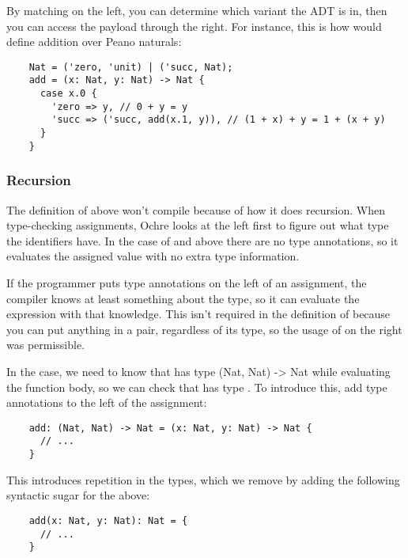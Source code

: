 \documentclass[12pt,twoside]{report}
\begin{document}
By matching on the left, you can determine which variant the ADT is in, then you can access the payload through the right. For instance, this is how would define addition over Peano naturals:

  \begin{verbatim}
    Nat = ('zero, 'unit) | ('succ, Nat);
    add = (x: Nat, y: Nat) -> Nat {
      case x.0 {
        'zero => y, // 0 + y = y
        'succ => ('succ, add(x.1, y)), // (1 + x) + y = 1 + (x + y)
      }
    }
  \end{verbatim}

\subsubsection{Recursion}
The definition of  above won't compile because of how it does recursion. When type-checking assignments, Ochre looks at the left first to figure out what type the identifiers have. In the case of  and  above there are no type annotations, so it evaluates the assigned value with no extra type information.

If the programmer puts type annotations on the left of an assignment, the compiler knows at least something about the type, so it can evaluate the expression with that knowledge. This isn't required in the definition of  because you can put anything in a pair, regardless of its type, so the usage of  on the right was permissible.

In the  case, we need to know that  has type {(Nat, Nat) -> Nat} while evaluating the function body, so we can check that  has type . To introduce this, add type annotations to the left of the assignment:

  \begin{verbatim}
    add: (Nat, Nat) -> Nat = (x: Nat, y: Nat) -> Nat {
      // ...
    }
  \end{verbatim}

This introduces repetition in the types, which we remove by adding the following syntactic sugar for the above:

  \begin{verbatim}
    add(x: Nat, y: Nat): Nat = {
      // ...
    }
  \end{verbatim}
\end{document}
